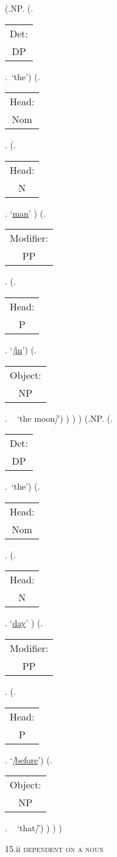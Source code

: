 \documentclass[12pt,letterpaper]{article}
\begin{document}
\begin{figure}
	\begin{center}
		\begin{parsetree}
			(.NP.
			(.\begin{tabular}{c}Det:\\DP\end{tabular}.~`the')
			(.\begin{tabular}{c}Head:\\Nom\end{tabular}.
			(.\begin{tabular}{c}Head:\\N\end{tabular}. `\underline{\underline{man}}' )
			(.\begin{tabular}{c}Modifier:\\PP\end{tabular}. 
			(.\begin{tabular}{c}Head:\\P\end{tabular}.  `\emph{[}\underline{in}')
			(.\begin{tabular}{c}Object:\\NP\end{tabular}. ~ `the moon\emph{]}')
			)
			)
			)
			(.NP.
			(.\begin{tabular}{c}Det:\\DP\end{tabular}.~`the')
			(.\begin{tabular}{c}Head:\\Nom\end{tabular}.
			(.\begin{tabular}{c}Head:\\N\end{tabular}. `\underline{\underline{day}}' )
			(.\begin{tabular}{c}Modifier:\\PP\end{tabular}. 
			(.\begin{tabular}{c}Head:\\P\end{tabular}.  `\emph{[}\underline{before}')
			(.\begin{tabular}{c}Object:\\NP\end{tabular}. ~ `that\emph{]}')
			)
			)
			)
			
			\hfill \break\hfill \break
		\end{parsetree}
		15.ii \textsc{dependent on a noun}
	\end{center}
\end{figure}
\end{document}
